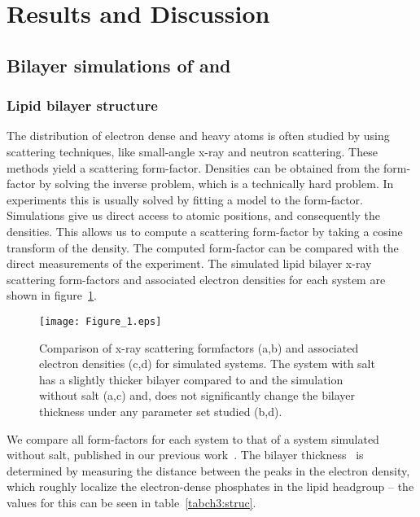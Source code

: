 \section{Results and Discussion}
\subsection{Bilayer simulations of \li{} and \mg{}}
\subsubsection{Lipid bilayer structure}
The distribution of electron dense and heavy atoms is often studied by using
scattering techniques, like small-angle x-ray and neutron scattering. 
These methods
yield a scattering form-factor.  Densities can be obtained from the form-factor by solving
the inverse problem, which is a technically hard problem. In experiments this is usually solved by fitting a model to the form-factor.
Simulations give us direct access to atomic positions, and consequently
the densities. This allows us to compute a scattering form-factor by taking a cosine transform of the density{. The computed
form-factor}
can be compared with the direct measurements of the experiment.
The simulated lipid bilayer x-ray scattering form-factors and associated 
electron densities for each system are shown in figure~\ref{figch3:eledens}.
\begin{figure}[h!tb]
    \caption[Comparison of SAXS formfactors]{Comparison of x-ray scattering formfactors (a,b) and associated electron densities (c,d) for simulated systems. 
    {The system with \li{}{} salt has a slightly thicker bilayer compared to \na and the simulation without salt (a,c) and},
    \mg does not significantly change the bilayer thickness
    under any parameter set studied (b,d). }
    \label{figch3:eledens}
    \texttt{[image: Figure\_1.eps]}
\end{figure}
We compare all form-factors for each system to that of a system simulated without salt, published
in our previous work~\cite{kruczek:2017}.
The bilayer thickness \dhh~is determined by measuring the distance between the
peaks in the electron density, which roughly localize the electron-dense phosphates in the
lipid headgroup -- the values for this can be seen in table~\ref{tabch3:struc}.
